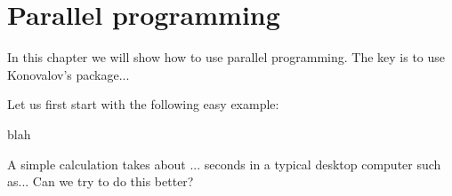 \chapter{Parallel programming}

In this chapter we will show how to use parallel programming. 
The key is to use Konovalov's package... 

Let us first start with the following easy 
example:

\begin{example}
blah
\end{example}

A simple calculation takes about ... seconds in a
typical desktop computer such as...
Can we try to do this better?

